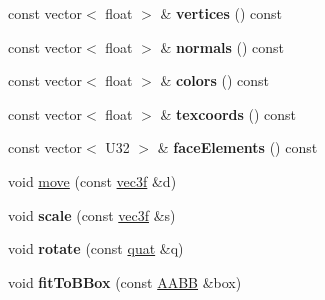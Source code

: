 \begin{DoxyCompactItemize}
\item 
\hypertarget{classps_1_1scene_1_1MeshNode_a3644efcb68695c76cc1979b2d84ae575}{}const vector$<$ float $>$ \& {\bfseries vertices} () const \label{classps_1_1scene_1_1MeshNode_a3644efcb68695c76cc1979b2d84ae575}

\item 
\hypertarget{classps_1_1scene_1_1MeshNode_a220bd015975bc9ad09f7cd30e5edb38f}{}const vector$<$ float $>$ \& {\bfseries normals} () const \label{classps_1_1scene_1_1MeshNode_a220bd015975bc9ad09f7cd30e5edb38f}

\item 
\hypertarget{classps_1_1scene_1_1MeshNode_ad13c76f480a5d4fa3835252e83744389}{}const vector$<$ float $>$ \& {\bfseries colors} () const \label{classps_1_1scene_1_1MeshNode_ad13c76f480a5d4fa3835252e83744389}

\item 
\hypertarget{classps_1_1scene_1_1MeshNode_a14335fa698f48c9f507719a731b964d3}{}const vector$<$ float $>$ \& {\bfseries texcoords} () const \label{classps_1_1scene_1_1MeshNode_a14335fa698f48c9f507719a731b964d3}

\item 
\hypertarget{classps_1_1scene_1_1MeshNode_a6eb251b5ad51cd1a9c91d244ee51f7b5}{}const vector$<$ U32 $>$ \& {\bfseries face\+Elements} () const \label{classps_1_1scene_1_1MeshNode_a6eb251b5ad51cd1a9c91d244ee51f7b5}

\item 
void \hyperlink{classps_1_1scene_1_1MeshNode_a402258ff6c02b502066391b2f45cc1a3}{move} (const \hyperlink{classps_1_1base_1_1Vec3}{vec3f} \&d)
\item 
\hypertarget{classps_1_1scene_1_1MeshNode_a139330df65d3b518c3a8027c64b76f72}{}void {\bfseries scale} (const \hyperlink{classps_1_1base_1_1Vec3}{vec3f} \&s)\label{classps_1_1scene_1_1MeshNode_a139330df65d3b518c3a8027c64b76f72}

\item 
\hypertarget{classps_1_1scene_1_1MeshNode_aeee4bb1242563f57d091746089c44090}{}void {\bfseries rotate} (const \hyperlink{classps_1_1base_1_1Quaternion}{quat} \&q)\label{classps_1_1scene_1_1MeshNode_aeee4bb1242563f57d091746089c44090}

\item 
\hypertarget{classps_1_1scene_1_1MeshNode_aa010507baafa5f58b3c36a0b5b749b87}{}void {\bfseries fit\+To\+B\+Box} (const \hyperlink{classps_1_1base_1_1AABB}{A\+A\+B\+B} \&box)\label{classps_1_1scene_1_1MeshNode_aa010507baafa5f58b3c36a0b5b749b87}

\end{DoxyCompactItemize}
